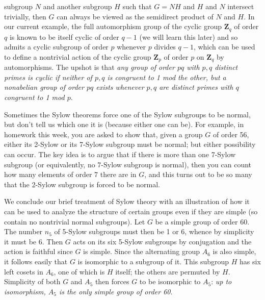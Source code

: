 \documentclass[10pt]{article}
\begin{document}
subgroup $N$ and another subgroup $H$ such that $G = NH$ and $H$ and $N$
intersect trivially, then $G$ can always be viewed as the semidirect
product of $N$ and $H$. In our current example, the full automorphism
group of the cyclic group $\mathbf{Z}_q$ of order $q$ is known to be
itself cyclic of order $q-1$ (we will learn this later) and so admits a
cyclic subgroup of order $p$ whenever $p$ divides $q-1$, which can be
used to define a nontrivial action of the cyclic group $\mathbf{Z}_p$ of
order $p$ on $\mathbf{Z}_q$ by automorphisms. The upshot is that {\sl
  any group of order $pq$ with $p,q$ distinct primes is cyclic if
  neither of $p,q$ is congruent to 1 mod the other, but a nonabelian
  group of order $pq$ exists whenever $p,q$ are distinct primes with $q$
  congruent to 1 mod $p$}.

Sometimes the Sylow theorems force one of the Sylow subgroups to be
normal, but don't tell us which one it is (because either one can be).
For example, in homework this week, you are asked to show that, given a
group $G$ of order 56, either its 2-Sylow or its 7-Sylow subgroup must
be normal; but either possibility can occur. The key idea is to argue
that if there is more than one 7-Sylow subgroup (or equivalently, no
7-Sylow subgroup is normal), then you can count how many elements of
order 7 there are in $G$, and this turns out to be so many that the
2-Sylow subgroup is forced to be normal.

We conclude our brief treatment of Sylow theory with an illustration of
how it can be used to analyze the structure of certain groups even if
they are simple (so contain no nontrivial normal subgroups). Let $G$ be
a simple group of order 60. The number $n_5$ of 5-Sylow subgroups must
then be 1 or 6, whence by simplicity it must be 6. Then $G$ acts on its
six 5-Sylow subgroups by conjugation and the action is faithful since
$G$ is simple. Since the alternating group $A_6$ is also simple, it
follows easily that $G$ is isomorphic to a subgroup of it. This subgroup
$H$ has six left cosets in $A_6$, one of which is $H$ itself; the others
are permuted by $H$. Simplicity of both $G$ and $A_5$ then forces $G$ to
be isomorphic to $A_5$: {\sl up to isomorphism, $A_5$ is the only simple
  group of order 60}.
\end{document}
